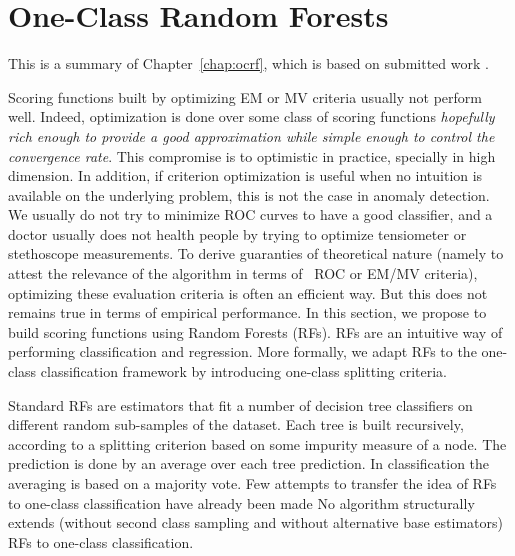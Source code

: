 \section{One-Class Random Forests}
\label{resume:ocrf}
This is a summary of Chapter~\ref{chap:ocrf}, which is based on submitted work \citep{OCRF16}.

Scoring functions built by optimizing EM or MV criteria usually not perform well. Indeed, optimization is done over some class of scoring functions \emph{hopefully rich enough to provide a good approximation while simple enough to control the convergence rate}. This compromise is to optimistic in practice, specially in high dimension. In addition, if criterion optimization is useful when no intuition is available on the underlying problem, this is not the case in anomaly detection. We usually do not try to minimize ROC curves to have a good classifier, and a doctor usually does not health people by trying to optimize tensiometer or stethoscope measurements. 
%
To derive guaranties of theoretical nature (namely to attest the relevance of the algorithm in terms of \eg~ROC or EM/MV criteria), optimizing these evaluation criteria is often an efficient way. 
But this does not remains true in terms of empirical performance. %
%
In this section, we propose to build scoring functions using Random Forests (RFs). RFs \citep{Breiman2001} are an intuitive way of performing classification and regression. More formally, we adapt RFs to the one-class classification framework by introducing one-class splitting criteria.

Standard RFs are estimators that fit a number of decision tree
classifiers on different random sub-samples of the dataset.
Each tree is built recursively, according to a splitting criterion based on
some impurity measure of a node. The prediction is done by an average over each tree prediction. In classification the averaging is based on a majority vote.
Few attempts to transfer the idea of RFs to one-class
classification have already been made \citep{Desir12, Liu2008, Shi2012}
%
No algorithm structurally extends (without second class sampling and without alternative base estimators) RFs to one-class classification.

